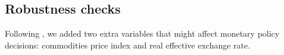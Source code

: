 \subsection{Robustness checks}
Following \citet{Sims1992}, we added two extra variables that might affect monetary policy decisions: commodities price index and real effective exchange rate.
